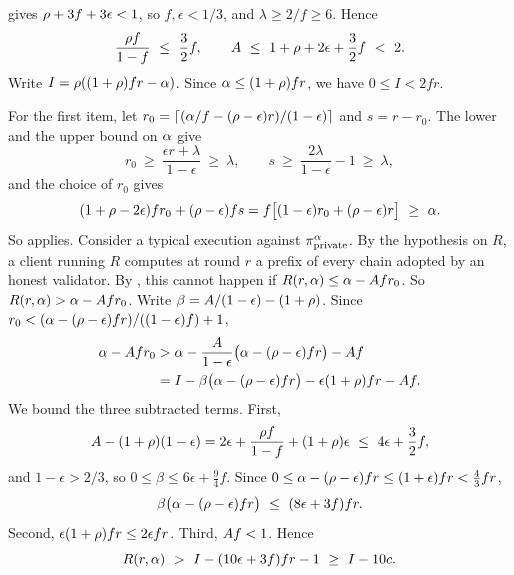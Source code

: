 \begin{proofof}{}
     gives $\rho+3f+3\epsilon<1$, so $f,\epsilon<1/3$, and
    $\lambda\ge2/f\ge6$. Hence
    \[
        \frac{\advr f}{1-f}\ \le\ \frac{3}{2}f,
        \qquad
        \maxr\ \le\ 1+\advr+2\epsilon+\frac{3}{2}f\ <\ 2 .
    \]
    Write $I=\rho((1+\rho)fr-\alpha)$. Since $\alpha\le(1+\rho)fr$, we have
    $0\le I<2fr$.

    For the first item, let
    $r_0=\lceil(\alpha/f-(\rho-\epsilon)r)/(1-\epsilon)\rceil$ and $s=r-r_0$.
    The lower and the upper bound on $\alpha$ give
    \[
        r_0\ \ge\ \frac{\epsilon r+\lambda}{1-\epsilon}\ \ge\ \lambda,
        \qquad
        s\ \ge\ \frac{2\lambda}{1-\epsilon}-1\ \ge\ \lambda ,
    \]
    and the choice of $r_0$ gives
    \[
        (1+\rho-2\epsilon)fr_0+(\rho-\epsilon)fs
        =f\big[(1-\epsilon)r_0+(\rho-\epsilon)r\big]\ \ge\ \alpha .
    \]
    So  applies. Consider a typical execution against
    $\pi_{\mathrm{private}}^\alpha$. By the hypothesis on $R$, a client running $R$ computes at
    round $r$ a prefix of every chain adopted by an honest validator. By
    , this cannot happen if $R(r,\alpha)\le\alpha-A fr_0$. So
    $R(r,\alpha)>\alpha-A fr_0$. Write
    $\beta=A/(1-\epsilon)-(1+\rho)$. Since
    $r_0<(\alpha-(\rho-\epsilon)fr)/((1-\epsilon)f)+1$,
    \begin{align*}
        \alpha-A fr_0
        &> \alpha-\frac{A}{1-\epsilon}\big(\alpha-(\rho-\epsilon)fr\big)-A f\\
        &= I-\beta\big(\alpha-(\rho-\epsilon)fr\big)-\epsilon(1+\rho)fr-A f .
    \end{align*}
    We bound the three subtracted terms. First,
    \[
        A-(1+\rho)(1-\epsilon)=2\epsilon+\frac{\rho f}{1-f}+(1+\rho)\epsilon
        \ \le\ 4\epsilon+\frac{3}{2}f ,
    \]
    and $1-\epsilon>2/3$, so $0\le\beta\le6\epsilon+\frac{9}{4}f$. Since
    $0\le\alpha-(\rho-\epsilon)fr\le(1+\epsilon)fr<\frac{4}{3}fr$,
    \[
        \beta\big(\hgt-(\advr-\epsilon)fr\big)\ \le\ (8\epsilon+3f)fr .
    \]
    Second, $\epsilon(1+\rho)fr\le2\epsilon fr$. Third, $A f<1$. Hence
    \[
        R(r,\hgt)\ >\ I-(10\epsilon+3f)fr-1\ \ge\ I-10c .
    \]


\end{proofof}
